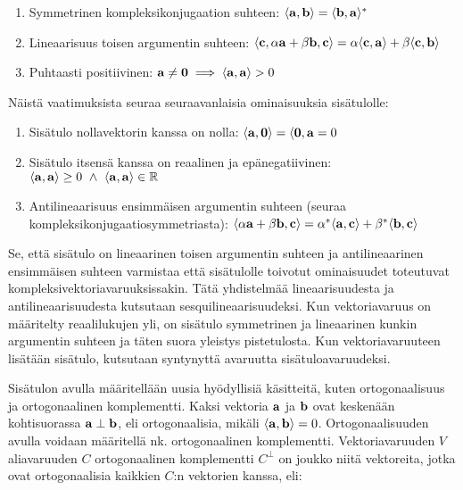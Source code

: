 \documentclass[../johdoksia.tex]{subfiles}
\begin{document}
	\begin{enumerate}
		\item Symmetrinen kompleksikonjugaation suhteen: $\langle\mathbf{a}, \mathbf{b}\rangle = \langle\mathbf{b}, \mathbf{a}\rangle^\ast$
		\item Lineaarisuus toisen argumentin suhteen: $\langle\mathbf{c}, \alpha\mathbf{a} + \beta\mathbf{b}, \mathbf{c}\rangle = \alpha\langle\mathbf{c}, \mathbf{a}\rangle + \beta\langle\mathbf{c},\mathbf{b}\rangle$
		\item Puhtaasti positiivinen: $\mathbf{a} \neq \mathbf{0} \implies \langle\mathbf{a}, \mathbf{a}\rangle > 0$
	\end{enumerate}

	Näistä vaatimuksista seuraa seuraavanlaisia ominaisuuksia sisätulolle:
	
	\begin{enumerate}
		\item Sisätulo nollavektorin kanssa on nolla: $\langle\mathbf{a}, \mathbf{0}\rangle = \langle\mathbf{0}, \mathbf{a} = 0$
		\item Sisätulo itsensä kanssa on reaalinen ja epänegatiivinen: $\langle\vtr{a}, \vtr{a}\rangle \geq 0 \ \land \ \langle\vtr{a}, \vtr{a}\rangle \in \mathbb{R}$
		\item Antilineaarisuus ensimmäisen argumentin suhteen (seuraa kompleksikonjugaatiosymmetriasta): $\langle\alpha\mathbf{a} + \beta\mathbf{b}, \mathbf{c}\rangle = \alpha^\ast\langle\mathbf{a},\mathbf{c}\rangle + \beta^\ast\langle\mathbf{b},\mathbf{c}\rangle$
	\end{enumerate}

	Se, että sisätulo on lineaarinen toisen argumentin suhteen ja antilineaarinen ensimmäisen suhteen varmistaa että sisätulolle toivotut ominaisuudet toteutuvat kompleksivektoriavaruuksissakin. Tätä yhdistelmää lineaarisuudesta ja antilineaarisuudesta kutsutaan sesquilineaarisuudeksi. Kun vektoriavaruus on määritelty reaalilukujen yli, on sisätulo symmetrinen ja lineaarinen kunkin argumentin suhteen ja täten suora yleistys pistetulosta. Kun vektoriavaruuteen lisätään sisätulo, kutsutaan syntynyttä avaruutta sisätuloavaruudeksi.
	
	Sisätulon avulla määritellään uusia hyödyllisiä käsitteitä, kuten ortogonaalisuus ja ortogonaalinen komplementti. Kaksi vektoria $\mathbf{a}$ ja $\mathbf{b}$ ovat keskenään kohtisuorassa $\mathbf{a} \perp \mathbf{b}$, eli ortogonaalisia, mikäli $\langle\mathbf{a},\mathbf{b}\rangle = 0$. Ortogonaalisuuden avulla voidaan määritellä nk. ortogonaalinen komplementti. Vektoriavaruuden $V$ aliavaruuden $C$ ortogonaalinen komplementti $C^\perp$ on joukko niitä vektoreita, jotka ovat ortogonaalisia kaikkien $C$:n vektorien kanssa, eli:
	
\end{document}
